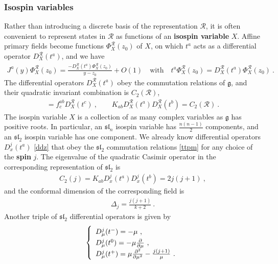 \documentclass[12pt, a4paper, notitlepage, twoside]{report}
\numberwithin{equation}{section}
\theoremstyle{break}
\begin{document}
\subsubsection{Isospin variables}

Rather than introducing a discrete basis of the representation $\mathcal{R}$, it is often convenient to represent states in $\mathcal{R}$ 
as functions of an \textbf{\boldmath isospin variable} $X$. 
Affine primary fields become functions $\Phi^\mathcal{R}_X(z_0)$ of $X$, on which $t^a$ acts as a differential operator $D_X^\mathcal{R}(t^a)$, 
and we have
\begin{align}
 J^a(y)\Phi^\mathcal{R}_X(z_0) = \frac{-D^\mathcal{R}_X(t^a)\Phi^\mathcal{R}_X(z_0)}{y-z_0}+O(1)\quad \text{with} \quad t^a \Phi^\mathcal{R}_X(z_0) = D_X^\mathcal{R}(t^a) \Phi^\mathcal{R}_X(z_0)\ .
\label{jprx}
\end{align}
The differential operators $D_X^\mathcal{R}(t^a)$ obey the commutation relations of $\mathfrak{g}$, and their quadratic invariant combination is $C_2(\mathcal{R})$,
\begin{align}
[D_X^\mathcal{R}(t^a),D_X^\mathcal{R}(t^b)] = f^{ab}_c D_X^\mathcal{R}(t^c)\ , \qquad K_{ab} D_X^\mathcal{R}(t^a)D_X^\mathcal{R}(t^b) = C_2(\mathcal{R})\ .
\label{dta}
\end{align}
The isospin variable $X$ is a collection of as many complex variables as $\mathfrak{g}$ has positive roots.
In particular, an $\mathfrak{sl}_n$ isospin variable has $\frac{n(n-1)}{2}$ components, and an $\mathfrak{sl}_2$ isospin variable has one component.
We already know differential operators $D^j_x(t^a)$ \eqref{ddz} that 
obey the $\mathfrak{sl}_2$ commutation relations \eqref{ttpm} for any choice of the 
\textbf{\boldmath spin} $j$.
The eigenvalue of the quadratic Casimir operator in the corresponding representation of $\mathfrak{sl}_2$ is
\begin{align}
 C_2(j) =  K_{ab}D_x^j(t^a)D_x^j(t^b) = 2j(j+1)\ ,
\end{align}
and the conformal dimension of the corresponding field is
\begin{align}
 \Delta_j =\frac{j(j+1)}{k+2}\ .
\label{dj}
\end{align}
Another triple of $\mathfrak{sl}_2$ differential operators is given by 
\begin{align}
\renewcommand{\arraystretch}{1.3}
\left\{\begin{array}{l}  
 D_\mu^j(t^-) = -\mu \ , \\  D_\mu^j(t^0) = -\mu{\frac{\partial}{\partial \mu}} \ , \\ D_\mu^j(t^+) = \mu\frac{\partial^2}{\partial\mu^2} -\frac{j(j+1)}{\mu}\ . \end{array}\right. 
\label{mub}
\end{align}
\end{document}
